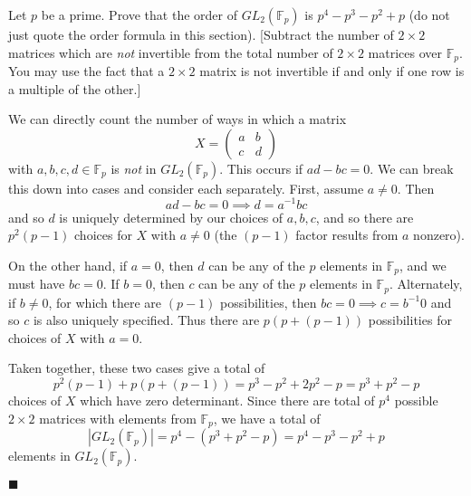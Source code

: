 \documentclass[12pt]{article}
\renewcommand{\qed}{\hfill$\blacksquare$}
\renewenvironment{proof}{\begin{addmargin}[1em]{0em}\begin{newproof}}{\end{newproof}\end{addmargin}\qed}
\newenvironment{problem}[2][Exercise]{\begin{trivlist}
\item[\hskip \labelsep {\bfseries #1}\hskip \labelsep {\bfseries #2.}]}{\end{trivlist}}
\begin{document}
\begin{problem}{1.4.7}
Let $p$ be a prime. Prove that the order of $GL_2\left(\mathbb{F}_p\right)$ is $p^4-p^3-p^2+p$ (do not just quote the order formula in this section). [Subtract the number of $2\times 2$ matrices which are \textit{not} invertible from the total number of $2\times 2$ matrices over $\mathbb{F}_p$. You may use the fact that a $2\times 2$ matrix is not invertible if and only if one row is a multiple of the other.]
\end{problem}
\begin{proof}
We can directly count the number of ways in which a matrix $$ X = \left(\begin{array}{cc} a & b \\ c & d \end{array}\right) $$ with $a,b,c,d\in \mathbb{F}_p$ is \textit{not} in $GL_2\left(\mathbb{F}_p\right)$. This occurs if $ad-bc = 0$. We can break this down into cases and consider each separately. First, assume $a\neq 0$. Then $$ ad-bc=0 \implies d = a^{-1}bc $$ and so $d$ is uniquely determined by our choices of $a,b,c$, and so there are $p^2\left(p-1\right)$ choices for $X$ with $a\neq 0$ (the $\left(p-1\right)$ factor results from $a$ nonzero).

On the other hand, if $a=0$, then $d$ can be any of the $p$ elements in $\mathbb{F}_p$, and we must have $bc=0$. If $b=0$, then $c$ can be any of the $p$ elements in $\mathbb{F}_p$. Alternately, if $b\neq 0$, for which there are $\left(p-1\right)$ possibilities, then $bc = 0 \implies c=b^{-1}0$ and so $c$ is also uniquely specified. Thus there are $p\left(p + \left(p-1\right)\right)$ possibilities for choices of $X$ with $a=0$.

Taken together, these two cases give a total of
$$ p^2\left(p-1\right) + p\left(p+\left(p-1\right)\right) = p^3 - p^2 +2p^2-p = p^3 +p^2-p $$ choices of $X$ which have zero determinant. Since there are total of $p^4$ possible $2\times 2$ matrices with elements from $\mathbb{F}_p$, we have a total of
$$ \left|GL_2\left(\mathbb{F}_p\right)\right| = p^4 - \left(p^3+p^2-p\right)=p^4-p^3-p^2+p $$ elements in $GL_2\left(\mathbb{F}_p\right)$.
\end{proof}
\end{document}
